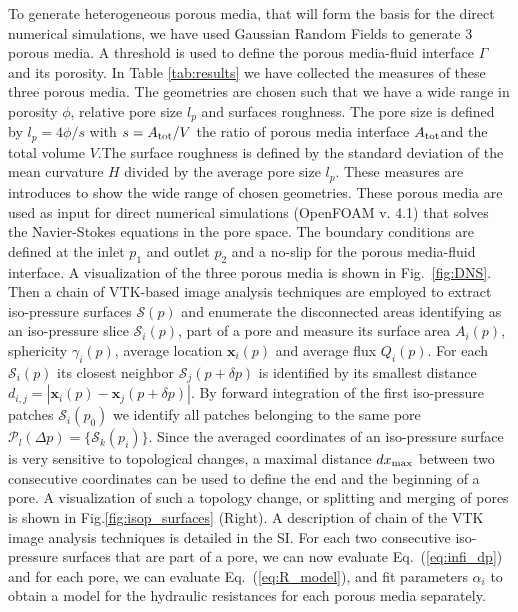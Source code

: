 \documentclass[draft]{agujournal2019}
\begin{document}
To generate heterogeneous porous media, that will form the basis for the direct numerical simulations, we have used Gaussian Random Fields to generate 3 porous media. A threshold is used to define the porous media-fluid interface $\Gamma$ and its porosity. In Table \ref{tab:results} we have collected the measures of these three porous media. The geometries are chosen such that we have a wide range in porosity $\phi$, relative pore size $l_p$ and surfaces roughness. The pore size is defined by $l_p = 4 \phi/s$ with $s= A_{\rm{tot}}/V$ the ratio of porous media interface $A_{\rm{tot}}$and the total volume $V$.The surface roughness is defined by the standard deviation of the mean curvature $H$ divided by the average pore size $l_p$. These measures are introduces to show the wide range of chosen geometries. These porous media are used as input for direct numerical simulations (OpenFOAM v. 4.1) \cite{weller_tensorial_1998} that solves the Navier-Stokes equations in the pore space. The boundary conditions are defined at the inlet $p_1$ and outlet $p_2$ and a no-slip for the porous media-fluid interface. A visualization of the three porous media is shown in Fig.~\ref{fig:DNS}. Then a chain of VTK-based image analysis techniques  are employed to extract iso-pressure surfaces $\mathcal{S}(p)$ and enumerate the disconnected areas identifying as an iso-pressure slice $\mathcal{S}_i(p)$, part of a pore and measure its surface area $A_i(p)$, sphericity $\gamma_i(p)$, average location $\mathbf{x}_i(p)$ and average flux $Q_i(p)$. For each $\mathcal{S}_i(p)$ its closest neighbor $\mathcal{S}_j(p+\delta p)$ is identified by its smallest distance $d_{i,j}= \left|  \mathbf{x}_i(p)-\mathbf{x}_j(p+\delta p)\right|$. By forward integration of the first iso-pressure patches $\mathcal{S}_i(p_0)$ we identify all patches belonging to the same pore $\mathcal{P}_l(\Delta p) = \{\mathcal{S}_k(p_i)\}$. Since the averaged coordinates of an iso-pressure surface is very sensitive to topological changes, a maximal distance $dx_{\rm{max}}$ between two consecutive coordinates can be used to define the end and the beginning of a pore. A visualization of such a topology change, or splitting and merging of pores is shown in Fig.\ref{fig:isop_surfaces} (Right). A description of chain of the VTK image analysis techniques is detailed in the SI. For each two consecutive iso-pressure surfaces that are part of a pore, we can now evaluate Eq.~(\ref{eq:infi_dp}) and for each pore, we can evaluate Eq.~(\ref{eq:R_model}), and fit parameters $\alpha_i$ to obtain a model for the hydraulic resistances for each porous media separately. 
\end{document}
